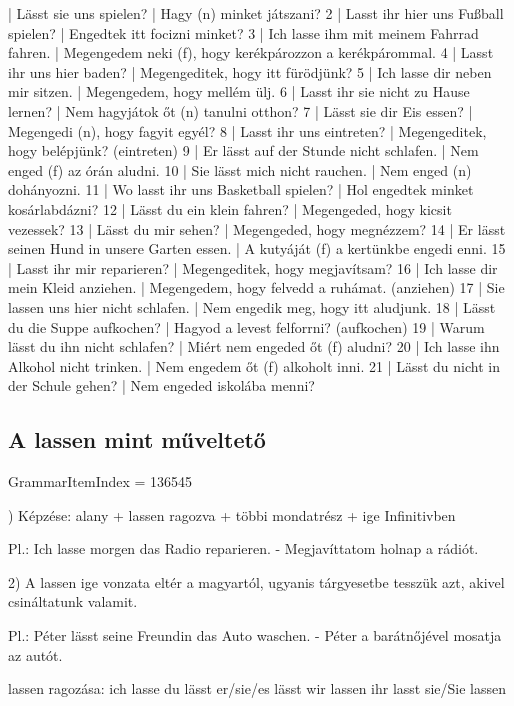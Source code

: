 \documentclass{article}
\newenvironment{desc}{\verbatim}{\endverbatim}
\newenvironment{exmp}{\verbatim}{\endverbatim}
\begin{document}
\begin{exmp}
1 | Lässt sie uns spielen? | Hagy (n) minket játszani?
2 | Lasst ihr hier uns Fußball spielen? | Engedtek itt focizni minket?
3 | Ich lasse ihm mit meinem Fahrrad fahren. | Megengedem neki (f), hogy kerékpározzon a kerékpárommal.
4 | Lasst ihr uns hier baden? | Megengeditek, hogy itt fürödjünk?
5 | Ich lasse dir neben mir sitzen. | Megengedem, hogy mellém ülj.
6 | Lasst ihr sie nicht zu Hause lernen? | Nem hagyjátok őt (n) tanulni otthon?
7 | Lässt sie dir Eis essen? | Megengedi (n), hogy fagyit egyél?
8 | Lasst ihr uns eintreten? | Megengeditek, hogy belépjünk? (eintreten)
9 | Er lässt auf der Stunde nicht schlafen. | Nem enged (f) az órán aludni.
10 | Sie lässt mich nicht rauchen. | Nem enged (n) dohányozni.
11 | Wo lasst ihr uns Basketball spielen? | Hol engedtek minket kosárlabdázni?
12 | Lässt du ein klein fahren? | Megengeded, hogy kicsit vezessek?
13 | Lässt du mir sehen? | Megengeded, hogy megnézzem?
14 | Er lässt seinen Hund in unsere Garten essen. | A kutyáját (f) a kertünkbe engedi enni.
15 | Lasst ihr mir reparieren? | Megengeditek, hogy megjavítsam?
16 | Ich lasse dir mein Kleid anziehen. | Megengedem, hogy felvedd a ruhámat. (anziehen)
17 | Sie lassen uns hier nicht schlafen. | Nem engedik meg, hogy itt aludjunk.
18 | Lässt du die Suppe aufkochen? | Hagyod a levest felforrni? (aufkochen)
19 | Warum lässt du ihn nicht schlafen? | Miért nem engeded őt (f) aludni?
20 | Ich lasse ihn Alkohol nicht trinken. | Nem engedem őt (f) alkoholt inni.
21 | Lässt du nicht in der Schule gehen? | Nem engeded iskolába menni?
\end{exmp}

\subsection{A lassen mint műveltető}

GrammarItemIndex = 136545

\begin{desc}
1) Képzése: alany + lassen ragozva + többi mondatrész + ige Infinitivben 

Pl.: Ich lasse morgen das Radio reparieren. - Megjavíttatom holnap a rádiót.

2) A lassen ige vonzata eltér a magyartól, ugyanis tárgyesetbe tesszük
azt, akivel csináltatunk valamit.

Pl.: Péter lässt seine Freundin das Auto waschen. - Péter a barátnőjével mosatja az autót.

lassen ragozása:
ich lasse
du lässt
er/sie/es lässt
wir lassen
ihr lasst
sie/Sie lassen
\end{desc}
\end{document}
